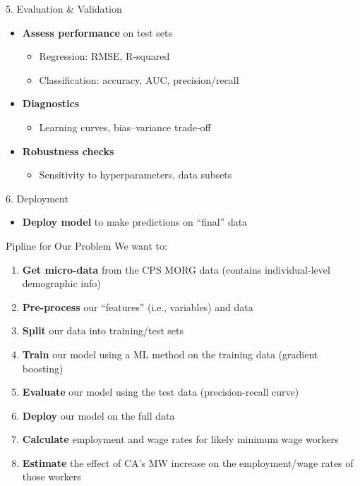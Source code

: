 \documentclass[
  ignorenonframetext,
]{beamer}
\providecommand{\tightlist}{%
  \setlength{\itemsep}{0pt}\setlength{\parskip}{0pt}}
\begin{document}
\begin{frame}{5. Evaluation \& Validation}
\label{evaluation-validation}
\begin{itemize}
\tightlist
\item
  \textbf{Assess performance} on test sets

  \begin{itemize}
  \tightlist
  \item
    Regression: RMSE, R-squared
  \item
    Classification: accuracy, AUC, precision/recall\\
  \end{itemize}
\item
  \textbf{Diagnostics}

  \begin{itemize}
  \tightlist
  \item
    Learning curves, bias--variance trade‑off
  \end{itemize}
\item
  \textbf{Robustness checks}

  \begin{itemize}
  \tightlist
  \item
    Sensitivity to hyperparameters, data subsets
  \end{itemize}
\end{itemize}
\end{frame}

\begin{frame}{6. Deployment}
\label{deployment}
\begin{itemize}
\tightlist
\item
  \textbf{Deploy model} to make predictions on ``final'' data
\end{itemize}
\end{frame}

\begin{frame}{Pipline for Our Problem}
\label{pipline-for-our-problem}
We want to:

\begin{enumerate}
\tightlist
\item
  \textbf{Get micro-data} from the CPS MORG data (contains
  individual-level demographic info)
\item
  \textbf{Pre-process} our ``features'' (i.e., variables) and data
\item
  \textbf{Split} our data into training/test sets
\item
  \textbf{Train} our model using a ML method on the training data
  (gradient boosting)
\item
  \textbf{Evaluate} our model using the test data (precision-recall
  curve)
\item
  \textbf{Deploy} our model on the full data
\item
  \textbf{Calculate} employment and wage rates for likely minimum wage
  workers
\item
  \textbf{Estimate} the effect of CA's MW increase on the
  employment/wage rates of those workers
\end{enumerate}
\end{frame}
\end{document}
